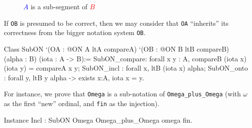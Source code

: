 \begin{figure}[h]
   \centering
   \caption{\textcolor{blue}{$A$} is a sub-segment  of \textcolor{red}{$B$}}
   \label{fig:subsegment}
 \end{figure}

If \texttt{OB} is presumed to be correct, then we may consider that \texttt{OA} ``inherits'' its correctness from the bigger notation system \texttt{OB}.


\label{types:SubON}

\begin{Coqsrc}
Class  SubON 
       `(OA : @ON A ltA  compareA)
       `(OB : @ON B ltB  compareB)
       (alpha :  B)
       (iota : A -> B):=
  {
  SubON_compare: forall x y : A,  compareB (iota x) (iota y) =
                                 compareA x y;
  SubON_incl : forall x, ltB (iota x) alpha;
  SubON_onto : forall y, ltB y alpha  -> exists x:A, iota x = y}.
\end{Coqsrc}

For instance, we prove that \texttt{Omega} is a sub-notation of
\texttt{Omega\_plus\_Omega} (with $\omega$ as the first ``new'' ordinal, and \texttt{fin} as the injection).

\begin{Coqsrc}
Instance Incl : SubON Omega Omega_plus_Omega omega fin.
\end{Coqsrc}



